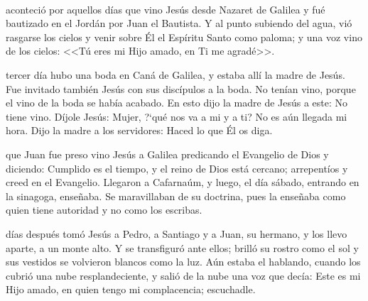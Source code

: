 \documentclass[10pt,twoside]{book}
\begin{document}
\noindent{}\\[4mm]
\space aconteció por aquellos días que vino Jesús desde Nazaret de Galilea y fué bautizado en el Jordán por Juan el Bautista.
Y al punto subiendo del agua, vió rasgarse los cielos y venir sobre Él el Espíritu Santo como paloma; y una voz vino de los cielos: 
<<Tú eres mi Hijo amado, en Ti me agradé>>.\\[-2mm]

\vspace{5mm}

\noindent{}
\vspace{2mm}
tercer día hubo una boda en Caná de Galilea, y estaba allí la madre de Jesús. Fue invitado también Jesús con sus discípulos a la boda.
No tenían vino, porque el vino de la boda se había acabado. En esto dijo la madre de Jesús a este: No tiene vino. Díjole Jesús: Mujer,
{?`}qué nos va a mi y a ti? No es aún llegada mi hora. Dijo la madre a los servidores: Haced lo que Él os diga.\\[2mm]

\vspace{5mm}

\noindent{}
\vspace{2mm}
que Juan fue preso vino Jesús a Galilea predicando el Evangelio de Dios y diciendo: Cumplido es el tiempo, y el reino de Dios está cercano;
arrepentíos y creed en el Evangelio. Llegaron a Cafarnaúm, y luego, el día sábado, entrando en la sinagoga, enseñaba. Se maravillaban de su doctrina,
pues la enseñaba como quien tiene autoridad y no como los escribas.\\[2mm]

\vspace{5mm}

\noindent{}
\vspace{2mm}
días después tomó Jesús a Pedro, a Santiago y a Juan, su hermano, y los llevo aparte, a un monte alto. Y se transfiguró ante ellos;
brilló su rostro como el sol y sus vestidos se volvieron blancos como la luz. Aún estaba el hablando, cuando los cubrió una nube resplandeciente,
y salió de la nube una voz que decía: Este es mi Hijo amado, en quien tengo mi complacencia; escuchadle.\\[2mm]

\vspace{5mm}
\end{document}
